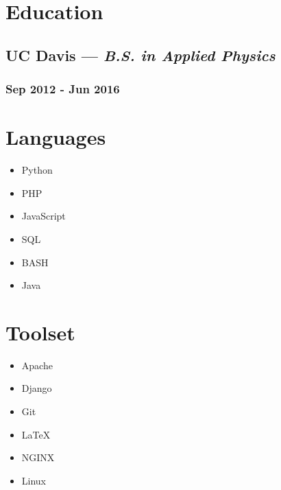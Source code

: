 \documentclass{article}
\begin{document}
\begin{minipage}[t]{.8\textwidth}
\section*{Education}
\subsection*{UC Davis --- \textit{B.S. in Applied Physics}}
\subsubsection*{Sep 2012 - Jun 2016}
\end{minipage}%
\hspace*{0.5cm}
\begin{minipage}[t]{.2\textwidth}
\section*{Languages}
\vspace{0.8em}
\begin{itemize}
	\item Python
	\item PHP
	\item JavaScript
	\item SQL
	\item BASH
	\item Java
\end{itemize}
\section*{Toolset}
\vspace{0.8em}
\begin{itemize}
	\item Apache
	\item Django
	\item Git
	\item \LaTeX
	\item NGINX
	\item Linux
\end{itemize}
\end{minipage}
\end{document}
